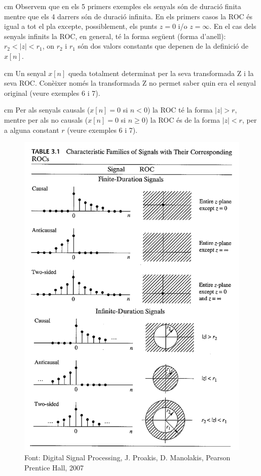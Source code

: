 \documentclass{article}
\begin{document}
 cm
\noindent
Observem que en els 5 primers exemples els senyals s\'on de duraci\'o finita mentre que els
4 darrers s\'on de duraci\'o infinita. En els primers casos la ROC \'es igual a tot el pla
excepte, possiblement, els punts $z=0$ i/o $z=\infty$.
En el cas dels senyals infinits la ROC, en general, t\'e la forma seg\"uent (forma d'anell):
$r_2 < |z| < r_1$, on $r_2$ i $r_1$ s\'on dos valors constants que depenen de la definici\'o de $x[n]$.

 cm
\noindent
Un senyal $x[n]$ queda totalment determinat per la seva transformada Z i la seva ROC. Con\`eixer
nom\'es la transformada Z no permet saber quin era el senyal original (veure exemples 6 i 7).

 cm
\noindent
Per als senyals causals ($x[n]=0$ si $n < 0$) la ROC t\'e la forma $|z| > r$, mentre per 
als no causals ($x[n]=0$ si $n \geq 0$) la ROC \'es de la forma $|z| < r$, per a alguna
constant $r$  (veure exemples 6 i 7).

\begin{figure}[htbp]
\begin{center}
\includegraphics[width=12cm]{signalROC.png}
\end{center}
\caption{Font: Digital Signal Processing, J. Proakis, D. Manolakis, Pearson Prentice Hall, 2007}
\end{figure}
\end{document}
